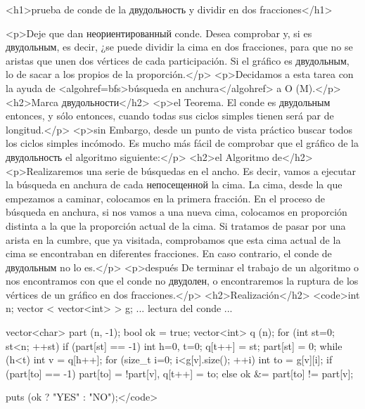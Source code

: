 <h1>prueba de conde de la двудольность y dividir en dos fracciones</h1>

<p>Deje que dan неориентированный conde. Desea comprobar y, si es двудольным, es decir, ¿se puede dividir la cima en dos fracciones, para que no se aristas que unen dos vértices de cada participación. Si el gráfico es двудольным, lo de sacar a los propios de la proporción.</p>
<p>Decidamos a esta tarea con la ayuda de <algohref=bfs>búsqueda en anchura</algohref> a O (M).</p>
<h2>Marca двудольности</h2>
<p>el Teorema. El conde es двудольным entonces, y sólo entonces, cuando todas sus ciclos simples tienen será par de longitud.</p>
<p>sin Embargo, desde un punto de vista práctico buscar todos los ciclos simples incómodo. Es mucho más fácil de comprobar que el gráfico de la двудольность el algoritmo siguiente:</p>
<h2>el Algoritmo de</h2>
<p>Realizaremos una serie de búsquedas en el ancho. Es decir, vamos a ejecutar la búsqueda en anchura de cada непосещенной la cima. La cima, desde la que empezamos a caminar, colocamos en la primera fracción. En el proceso de búsqueda en anchura, si nos vamos a una nueva cima, colocamos en proporción distinta a la que la proporción actual de la cima. Si tratamos de pasar por una arista en la cumbre, que ya visitada, comprobamos que esta cima actual de la cima se encontraban en diferentes fracciones. En caso contrario, el conde de двудольным no lo es.</p>
<p>después De terminar el trabajo de un algoritmo o nos encontramos con que el conde no двудолен, o encontraremos la ruptura de los vértices de un gráfico en dos fracciones.</p>
<h2>Realización</h2>
<code>int n;
vector < vector<int> > g;
... lectura del conde ...

vector<char> part (n, -1);
bool ok = true;
vector<int> q (n);
for (int st=0; st<n; ++st)
if (part[st] == -1) {
int h=0, t=0;
q[t++] = st;
part[st] = 0;
while (h<t) {
int v = q[h++];
for (size_t i=0; i<g[v].size(); ++i) {
int to = g[v][i];
if (part[to] == -1)
part[to] = !part[v], q[t++] = to;
else
ok &= part[to] != part[v];
}
}
}

puts (ok ? "YES" : "NO");</code>
